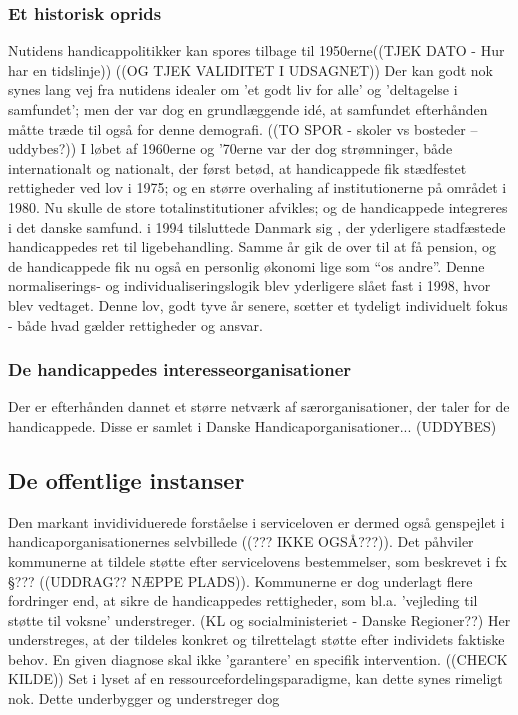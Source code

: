\subsubsection{Et historisk oprids}
Nutidens handicappolitikker kan spores tilbage til 1950erne((TJEK DATO - Hur har en tidslinje)) ((OG TJEK VALIDITET I UDSAGNET))
Der kan godt nok synes lang vej fra nutidens idealer om 'et godt liv for alle' og 'deltagelse i samfundet'; men der var dog en grundlæggende idé, at samfundet efterhånden måtte træde til også for denne demografi.
((TO SPOR - skoler vs bosteder -- uddybes?))
I løbet af 1960erne og '70erne var der dog strømninger, både internationalt og nationalt, der først betød, at handicappede fik stædfestet rettigheder ved lov i 1975; og en større overhaling af institutionerne på området i 1980.
Nu skulle de store totalinstitutioner afvikles; og de handicappede integreres i det danske samfund. 
i 1994 tilsluttede Danmark sig , der yderligere stadfæstede handicappedes ret til ligebehandling. Samme år gik de over til at få pension, og de handicappede fik nu også en personlig økonomi lige som “os andre”.
Denne normaliserings- og individualiseringslogik blev yderligere slået fast i 1998, hvor  blev vedtaget.
Denne lov, godt tyve år senere, sœtter et tydeligt individuelt fokus - både hvad gælder rettigheder og ansvar.

\subsubsection{De handicappedes interesseorganisationer}
Der er efterhånden dannet et større netværk af særorganisationer, der taler for de handicappede.
Disse er samlet i Danske Handicaporganisationer... (UDDYBES)

\subsection{De offentlige instanser}
Den markant invidividuerede forståelse i serviceloven er dermed også genspejlet i handicaporganisationernes selvbillede ((??? IKKE OGSÅ???)).
Det påhviler kommunerne at tildele støtte efter servicelovens bestemmelser, som beskrevet i fx §??? ((UDDRAG?? NÆPPE PLADS)).
Kommunerne er dog underlagt flere fordringer end, at sikre de handicappedes rettigheder, som bl.a. 'vejleding til støtte til voksne' understreger. (KL og socialministeriet - Danske Regioner??)
Her understreges, at der tildeles konkret og tilrettelagt støtte efter individets faktiske behov.
En given diagnose skal ikke 'garantere' en specifik intervention. ((CHECK KILDE))
Set i lyset af en ressourcefordelingsparadigme, kan dette synes rimeligt nok. Dette underbygger og understreger dog 

